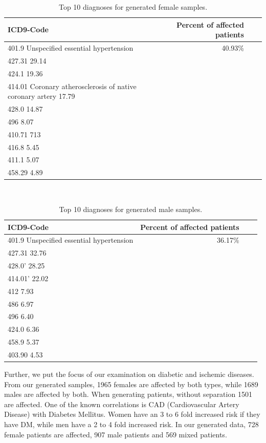\documentclass[11pt, a4paper]{book}
\begin{document}
\begin{table}
\begin{tabularx}{\textwidth}{p{}|r|X|r}
\textbf{ICD9-Code} & \textbf{Percent of affected patients}\\
\hline
401.9 Unspecified essential hypertension & 40.93\%\\
427.31 29.14\\
424.1 19.36\\
414.01 Coronary atherosclerosis of native coronary artery 17.79 \\
428.0   14.87\\
496		8.07\\
410.71 713\\
416.8      5.45\\
411.1      5.07\\
458.29     4.89\\
\end{tabularx}
\caption{\label{tab:top10-icd-female}Top 10 diagnoses for generated female samples.}
\end{table}
\\
\begin{table}
\begin{tabularx}{\textwidth}{p{}|r|X|r}
\textbf{ICD9-Code} & \textbf{Percent of affected patients}\\
\hline
401.9 Unspecified essential hypertension & 36.17\%\\
427.31	32.76\\
428.0'     28.25\\
414.01'    22.02\\
412        7.93\\
486        6.97\\
496        6.40\\
424.0      6.36\\
458.9      5.37\\
403.90     4.53\\
\end{tabularx}
\caption{\label{tab:top10-icd-male}Top 10 diagnoses for generated male samples.}
\end{table}
Further, we put the focus of our examination on diabetic and ischemic diseases. 
From our generated samples, 1965 females are affected by both types, while 1689 males are affected by both. When generating patients, without separation 1501 are affected.
One of the known correlations is CAD (Cardiovascular Artery Disease) with Diabetes Mellitus. Women have an 3 to 6 fold increased risk if they have DM, while men have a 2 to 4 fold increased risk. \cite{juutilainen2004gender} In our generated data, 728 female patients are affected, 907 male patients and 569 mixed patients.
\end{document}
